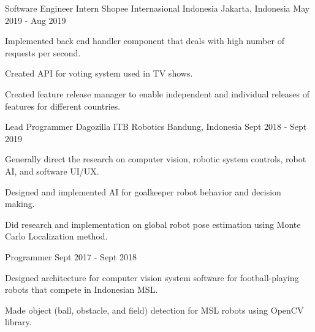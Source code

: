

\begin{cventries}

  \cventry
    {Software Engineer Intern} %
    {Shopee Internasional Indonesia} %
    {Jakarta, Indonesia} %
    {May 2019 - Aug 2019} %
    {
      \begin{cvitems} %
        \item {Implemented back end handler component that deals with high number of requests per second.}
        \item {Created API for voting system used in TV shows.}
        \item {Created feature release manager to enable independent and individual releases of features for different countries.}
      \end{cvitems}
    }


  \cventry
	{Lead Programmer} %
	{Dagozilla ITB Robotics} %
	{Bandung, Indonesia} %
	{Sept 2018 - Sept 2019} %
	{
	  \begin{cvitems} %
		\item {Generally direct the research on computer vision, robotic system controls, robot AI, and software UI/UX.}
		\item {Designed and implemented AI for goalkeeper robot behavior and decision making.}
		\item {Did research and implementation on global robot pose estimation using Monte Carlo Localization method.}
	  \end{cvitems}
	}


  \cventry
	{Programmer} %
	{} %
	{} %
	{Sept 2017 - Sept 2018} %
	{
	  \begin{cvitems} %
		\item {Designed architecture for computer vision system software for football-playing robots that compete in Indonesian MSL.}
		\item {Made object (ball, obstacle, and field) detection for MSL robots using OpenCV library.}
	  \end{cvitems}
	}
\end{cventries}
